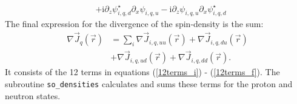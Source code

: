 \documentclass[3p]{elsarticle}
\begin{document}
\begin{itemize}
\begin{align}
& + \mathrm{i} \partial_z  \psi_{i,q,d}^\star \partial_x \psi_{i,q,u} - \mathrm{i} \partial_z \psi_{i,q,u} \partial_x  \psi_{i,q,d}^\star \nonumber
\label{12terms_f}
\end{align}
The final expression for the divergence of the spin-density is the sum:
\begin{align}
\nabla \vec{J}_q (\vec{r}) &=  \sum\nolimits_i  \nabla \vec{J}_{i,q, uu} (\vec{r}) + \nabla \vec{J}_{i,q, d u} (\vec{r}) \nonumber\\
&+ \nabla \vec{J}_{i,q, u d} (\vec{r}) + \nabla \vec{J}_{i,q, d d}  (\vec{r})  .
\end{align}
It consists of the 12 terms in equations (\ref{12terms_i}) - (\ref{12terms_f}). The subroutine \texttt{so\_densities} calculates and sums these terms for the proton and neutron states.
\end{itemize}
\end{document}
